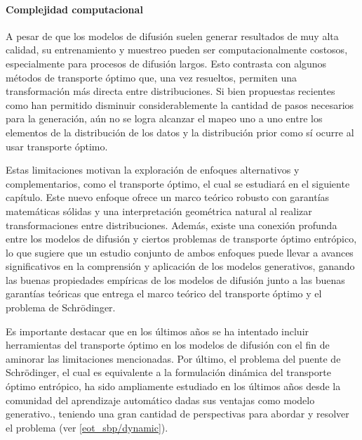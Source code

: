 \paragraph{Complejidad computacional}
A pesar de que los modelos de difusión suelen generar resultados de muy alta calidad, su entrenamiento y muestreo pueden ser computacionalmente costosos, especialmente para procesos de difusión largos. Esto contrasta con algunos métodos de transporte óptimo que, una vez resueltos, permiten una transformación más directa entre distribuciones. Si bien propuestas recientes como \cite{song2023consistencymodels} han permitido disminuir considerablemente la cantidad de pasos necesarios para la generación, aún no se logra alcanzar el mapeo uno a uno entre los elementos de la distribución de los datos y la distribución prior como sí ocurre al usar transporte óptimo.

Estas limitaciones motivan la exploración de enfoques alternativos y complementarios, como el transporte óptimo, el cual se estudiará en el siguiente capítulo. Este nuevo enfoque ofrece un marco teórico robusto con garantías matemáticas sólidas y una interpretación geométrica natural al realizar transformaciones entre distribuciones. Además, existe una conexión profunda entre los modelos de difusión y ciertos problemas de transporte óptimo entrópico, lo que sugiere que un estudio conjunto de ambos enfoques puede llevar a avances significativos en la comprensión y aplicación de los modelos generativos, ganando las buenas propiedades empíricas de los modelos de difusión junto a las buenas garantías teóricas que entrega el marco teórico del transporte óptimo y el problema de Schrödinger.

Es importante destacar que en los últimos años se ha intentado incluir herramientas del transporte óptimo en los modelos de difusión con el fin de aminorar las limitaciones mencionadas. Por último, el problema del puente de Schrödinger, el cual es equivalente a la formulación dinámica del transporte óptimo entrópico, ha sido ampliamente estudiado en los últimos años desde la comunidad del aprendizaje automático dadas sus ventajas como modelo generativo., teniendo una gran cantidad de perspectivas para abordar y resolver el problema (ver \autoref{eot_sbp/dynamic}).